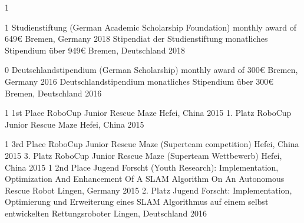 \multilang
  {1}
  {}
  {}


\begin{cvhonors}

\multilang
  {1}
  {\cvhonor
    {Studienstiftung (German Academic Scholarship Foundation)} %
    {monthly award of 649€}
    {Bremen, Germany} %
    {2018} %
  }{\cvhonor
    {Stipendiat der Studienstiftung}
    {monatliches Stipendium über 949€}
    {Bremen, Deutschland}
    {2018}
  }

\multilang
  {0}
  {\cvhonor
    {Deutschlandstipendium (German Scholarship)} %
    {monthly award of 300€}
    {Bremen, Germany} %
    {2016} %
  }{\cvhonor
    {Deutschlandstipendium}
    {monatliches Stipendium über 300€}
    {Bremen, Deutschland}
    {2016}
  }

\multilang
  {1}
  {\cvhonor
    {1st Place} %
    {RoboCup Junior Rescue Maze} %
    {Hefei, China} %
    {2015} %
  }{\cvhonor
    {1. Platz}
    {RoboCup Junior Rescue Maze}
    {Hefei, China}
    {2015}
  }

\multilang
  {1}
  {\cvhonor
    {3rd Place} %
    {RoboCup Junior Rescue Maze (Superteam competition)} %
    {Hefei, China} %
    {2015} %
  }{\cvhonor
    {3. Platz}
    {RoboCup Junior Rescue Maze (Superteam Wettbewerb)}
    {Hefei, China} %
    {2015} %
  }
\multilang
  {1}
  {\cvhonor
    {2nd Place} %
    {Jugend Forscht (Youth Research): Implementation, Optimization And Enhancement Of A SLAM Algorithm On An Autonomous Rescue Robot} %
    {Lingen, Germany} %
    {2015} %
  }{\cvhonor
    {2. Platz}
    {Jugend Forscht: Implementation, Optimierung und Erweiterung eines SLAM Algorithmus auf einem selbst entwickelten Rettungsroboter}
    {Lingen, Deutschland}
    {2016}
  }
  

\end{cvhonors}
